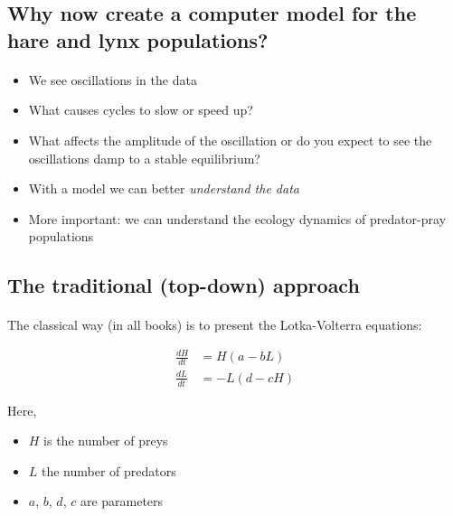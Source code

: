 \documentclass[%
oneside,                 %
final,                   %
10pt]{article}
\begin{document}
\subsection*{Why now create a computer model for the hare and lynx populations?}

\paragraph{}
\begin{itemize}
 \item We see oscillations in the data

 \item What causes cycles to slow or speed up?

 \item What affects the amplitude of the oscillation or do you expect to see the oscillations damp to a stable equilibrium?

 \item With a model we can better \emph{understand the data}

 \item More important: we can understand the ecology dynamics of
   predator-pray populations
\end{itemize}

\noindent




\subsection*{The traditional (top-down) approach}


\paragraph{}
The classical way (in all books) is to present the Lotka-Volterra equations:

\begin{align*}
\frac{dH}{dt} &= H(a - b L)\\ 
\frac{dL}{dt} &= - L(d - c  H)
\end{align*}

Here,

\begin{itemize}
 \item $H$ is the number of preys

 \item $L$ the number of predators

 \item $a$, $b$, $d$, $c$ are parameters
\end{itemize}
\end{document}
